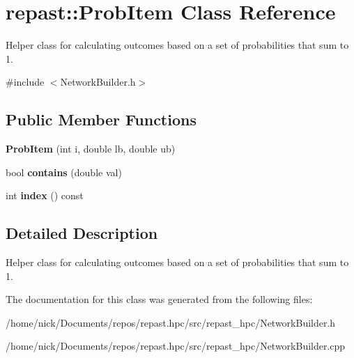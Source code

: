 \hypertarget{classrepast_1_1_prob_item}{\section{repast\-:\-:Prob\-Item Class Reference}
\label{classrepast_1_1_prob_item}
}


Helper class for calculating outcomes based on a set of probabilities that sum to 1.  




{\ttfamily \#include $<$Network\-Builder.\-h$>$}

\subsection*{Public Member Functions}
\begin{DoxyCompactItemize}
\item 
\hypertarget{classrepast_1_1_prob_item_ae40fde5da262714602d99b006ed2bedd}{{\bfseries Prob\-Item} (int i, double lb, double ub)}\label{classrepast_1_1_prob_item_ae40fde5da262714602d99b006ed2bedd}

\item 
\hypertarget{classrepast_1_1_prob_item_a5fce5b58f3bf91f429b12e36be97056e}{bool {\bfseries contains} (double val)}\label{classrepast_1_1_prob_item_a5fce5b58f3bf91f429b12e36be97056e}

\item 
\hypertarget{classrepast_1_1_prob_item_ac810de8aae7b756cc74f0c6c394c7dcf}{int {\bfseries index} () const }\label{classrepast_1_1_prob_item_ac810de8aae7b756cc74f0c6c394c7dcf}

\end{DoxyCompactItemize}


\subsection{Detailed Description}
Helper class for calculating outcomes based on a set of probabilities that sum to 1. 

The documentation for this class was generated from the following files\-:\begin{DoxyCompactItemize}
\item 
/home/nick/\-Documents/repos/repast.\-hpc/src/repast\-\_\-hpc/Network\-Builder.\-h\item 
/home/nick/\-Documents/repos/repast.\-hpc/src/repast\-\_\-hpc/Network\-Builder.\-cpp\end{DoxyCompactItemize}
